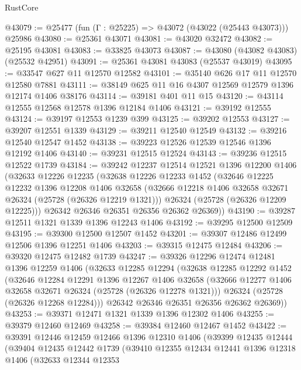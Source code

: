 \begin{lexlean}{RustCore}
\begin{coremodule}
@43079 := @25477 (fun (Γ : @25225) => @43072 (@43022 (@25443 @43073))) @25986
@43080 := @25361 @43071
@43081 := @43020 @32472
@43082 := @25195 @43081
@43083 := @33825 @43073
@43087 := @43080 (@43082 @43083) (@25532 @42951)
@43091 := @25361 @43081 @43083 (@25537 @43019)
@43095 := @33547 @627 @11 @12570 @12582
@43101 := @35140 @626 @17 @11 @12570 @12580 @7881
@43111 := @38149 @625 @11 @16 @4307 @12569 @12579 @1396 @12174 @1406 @38176
@43114 := @39181 @401 @11 @15
@43120 := @43114 @12555 @12568 @12578 @1396 @12184 @1406
@43121 := @39192 @12555
@43124 := @39197 @12553 @1239 @399
@43125 := @39202 @12553
@43127 := @39207 @12551 @1339
@43129 := @39211 @12540 @12549
@43132 := @39216 @12540 @12547 @1452
@43138 := @39223 @12526 @12539 @12546 @1396 @12192 @1406
@43140 := @39231 @12515 @12524
@43143 := @39236 @12515 @12522 @1739
@43184 := @39242
    @12237
    @12514
    @12521
    @1396
    @12200
    @1406
    (@32633
      @12226
      @12235
      (@32638
        @12226
        @12233
        @1452
        (@32646
          @12225
          @12232
          @1396
          @12208
          @1406
          @32658
          (@32666 @12218 @1406 @32658 @32671 @26324 (@25728 (@26326 @12219 @1321)))
          @26324
          (@25728 (@26326 @12209 @12225)))
        @26342
        @26346
        @26351
        @26356
        @26362
        @26369))
@43190 := @39287 @12511 @1321 @1339 @1396 @12243 @1406
@43192 := @39295 @12500 @12509
@43195 := @39300 @12500 @12507 @1452
@43201 := @39307 @12486 @12499 @12506 @1396 @12251 @1406
@43203 := @39315 @12475 @12484
@43206 := @39320 @12475 @12482 @1739
@43247 := @39326
    @12296
    @12474
    @12481
    @1396
    @12259
    @1406
    (@32633
      @12285
      @12294
      (@32638
        @12285
        @12292
        @1452
        (@32646
          @12284
          @12291
          @1396
          @12267
          @1406
          @32658
          (@32666 @12277 @1406 @32658 @32671 @26324 (@25728 (@26326 @12278 @1321)))
          @26324
          (@25728 (@26326 @12268 @12284)))
        @26342
        @26346
        @26351
        @26356
        @26362
        @26369))
@43253 := @39371 @12471 @1321 @1339 @1396 @12302 @1406
@43255 := @39379 @12460 @12469
@43258 := @39384 @12460 @12467 @1452
@43422 := @39391
    @12446
    @12459
    @12466
    @1396
    @12310
    @1406
    (@39399
      @12435
      @12444
      (@39404
        @12435
        @12442
        @1739
        (@39410
          @12355
          @12434
          @12441
          @1396
          @12318
          @1406
          (@32633
            @12344
            @12353

\end{coremodule}
\end{lexlean}
